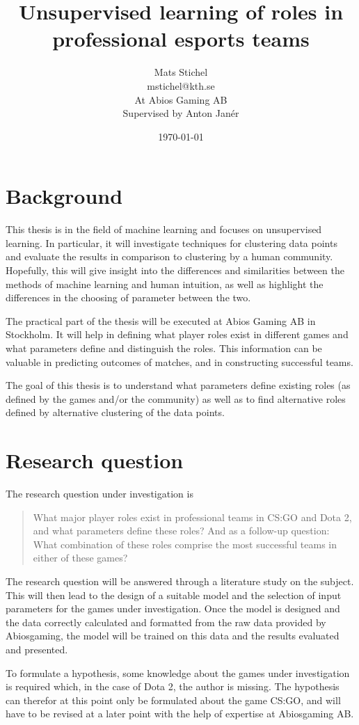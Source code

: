 \documentclass{article}
\title{Unsupervised learning of roles in professional esports teams}
\author{Mats Stichel \\ mstichel@kth.se \\ At Abios Gaming AB \\ Supervised by Anton Janér}
\date{\today}
\begin{document}
\maketitle

\section{Background}
This thesis is in the field of machine learning and focuses on unsupervised learning. In particular, it will investigate techniques for clustering data points and evaluate the results in comparison to clustering by a human community. Hopefully, this will give insight into the differences and similarities between the methods of machine learning and human intuition, as well as highlight the differences in the choosing of parameter between the two.

The practical part of the thesis will be executed at Abios Gaming AB in Stockholm. It will help in defining what player roles exist in different games and what parameters define and distinguish the roles. This information can be valuable in predicting outcomes of matches, and in constructing successful teams.

The goal of this thesis is to understand what parameters define existing roles (as defined by the games and/or the community) as well as to find alternative roles defined by alternative clustering of the data points.

\section{Research question}
The research question under investigation is
\begin{quote}
    What major player roles exist in professional teams in CS:GO and Dota 2, and what parameters define these roles? And as a follow-up question: What combination of these roles comprise the most successful teams in either of these games?
\end{quote}

The research question will be answered through a literature study on the subject. This will then lead to the design of a suitable model and the selection of input parameters for the games under investigation. Once the model is designed and the data correctly calculated and formatted from the raw data provided by Abiosgaming, the model will be trained on this data and the results evaluated and presented.

To formulate a hypothesis, some knowledge about the games under investigation is required which, in the case of Dota 2, the author is missing. The hypothesis can therefor at this point only be formulated about the game CS:GO, and will have to be revised at a later point with the help of expertise at Abiosgaming AB.
\end{document}
